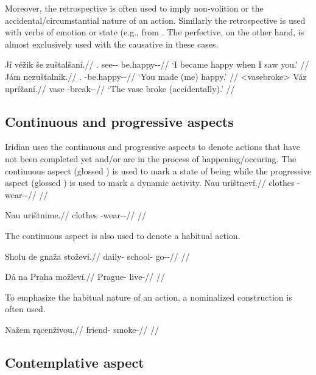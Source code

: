 Moreover, the retrospective is often used to imply non-volition or the
accidental/circumstantial nature of an action. Similarly the retrospective is
used with verbs of emotion or state (e.g.,  from
. The perfective, on the other hand, is almost exclusively
used with the causative in these cases.

\pex
\a	\begingl
\gla Jí véžik še zuštalšaní.//
\glb \Second{}\Sg{}.\Acc{} see-\Av{}-\Pf{} \Com{} be.happy-\Av{}-\Ret{}//
\glft `I became happy when I saw you.' //
\endgl
\a	\begingl
\gla Jám nezuštalnik.//
\glb \Second{}\Sg{}.\Agt{} \Caus{}-be.happy-\Pv{}-\Pf{}//
\glft `You made (me) happy.' //
\endgl
\xe
\pex<vasebroke>
\begingl
\gla Váz uprížaní.//
\glb vase \Refl{}-break-\Av{}-\Pf{}//
\glft `The vase broke (accidentally).' //
\endgl
\xe

\subsection{Continuous and progressive aspects}
Iridian uses the continuous and progressive aspects to denote actions that have
not been completed yet and/or are in the process of happening/occuring. The
continuous aspect (glossed \Cont{}) is used to mark a state of being while the
progressive aspect (glossed \Prog{}) is used to mark a dynamic activity.
\pex
\begingl
\gla Nau urištneví.//
\glb clothes \Refl{}-wear-\Pv{}-\Cont{}//
\glft {} //
\endgl
\xe

\pex
\begingl
\gla Nau urištnime.//
\glb clothes \Refl{}-wear-\Pv{}-\Prog{}//
\glft {} //
\endgl
\xe

The continuous aspect is also used to denote a habitual action.

\pex
\begingl
\gla Sholu de gnaža stoževí.//
\glb daily-\Ins{}  school-\Acc{} go-\Av{}-\Cont{}//
\glft {} //
\endgl
\xe

\pex
\begingl
\gla Dá na Praha možleví.//
\glb \First{}\Sg{} \Loc{} Prague-\Acc{} live-\Cont{}//
\glft {} //
\endgl
\xe

To emphasize the habitual nature of an action, a nominalized construction is
often used.

\pex
\begingl
\gla Nažem rącenživou.//
\glb friend-\First{}\Sg{} smoke-//
\glft {} //
\endgl
\xe

\subsection{Contemplative aspect}

